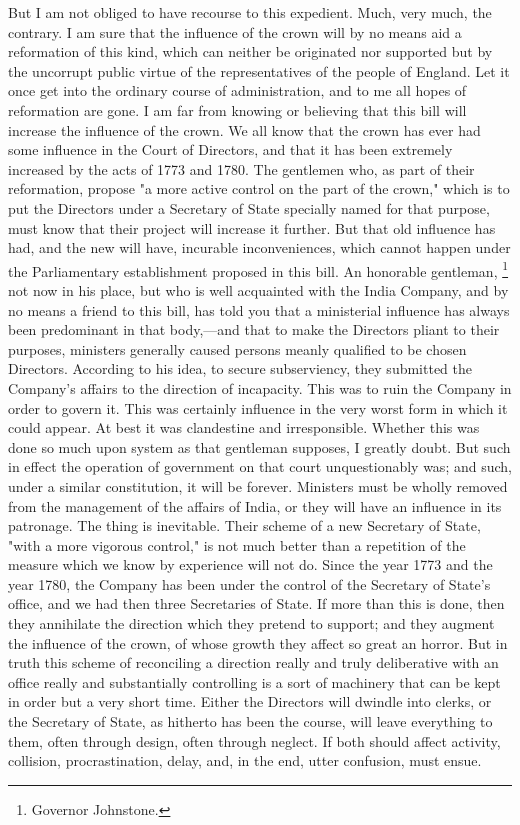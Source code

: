 But I am not obliged to have recourse to this expedient. Much, very much, the contrary. I am sure that the influence of the crown will by no means aid a reformation of this kind, which can neither be originated nor supported but by the uncorrupt public virtue of the representatives of the people of England. Let it once get into the ordinary course of administration, and to me all hopes of reformation are gone. I am far from knowing or believing that this bill will increase the influence of the crown. We all know that the crown has ever had some influence in the Court of Directors, and that it has been extremely increased by the acts of 1773 and 1780. The gentlemen who, as part of their reformation, propose "a more active control on the part of the crown," which is to put the Directors under a Secretary of State specially named for that purpose, must know that their project will increase it further. But that old influence has had, and the new will have, incurable inconveniences, which cannot happen under the Parliamentary establishment proposed in this bill. An honorable gentleman, 
\footnote{ Governor Johnstone.}
 not now in his place, but who is well acquainted with the India Company, and by no means a friend to this bill, has told you that a ministerial influence has always been predominant in that body,—and that to make the Directors pliant to their purposes, ministers generally caused persons meanly qualified to be chosen Directors. According to his idea, to secure subserviency, they submitted the Company's affairs to the direction of incapacity. This was to ruin the Company in order to govern it. This was certainly influence in the very worst form in which it could appear. At best it was clandestine and irresponsible. Whether this was done so much upon system as that gentleman supposes, I greatly doubt. But such in effect the operation of government on that court unquestionably was; and such, under a similar constitution, it will be forever. Ministers must be wholly removed from the management of the affairs of India, or they will have an influence in its patronage. The thing is inevitable. Their scheme of a new Secretary of State, "with a more vigorous control," is not much better than a repetition of the measure which we know by experience will not do. Since the year 1773 and the year 1780, the Company has been under the control of the Secretary of State's office, and we had then three Secretaries of State. If more than this is done, then they annihilate the direction which they pretend to support; and they augment the influence of the crown, of whose growth they affect so great an horror. But in truth this scheme of reconciling a direction really and truly deliberative with an office really and substantially controlling is a sort of machinery that can be kept in order but a very short time. Either the Directors will dwindle into clerks, or the Secretary of State, as hitherto has been the course, will leave everything to them, often through design, often through neglect. If both should affect activity, collision, procrastination, delay, and, in the end, utter confusion, must ensue.

